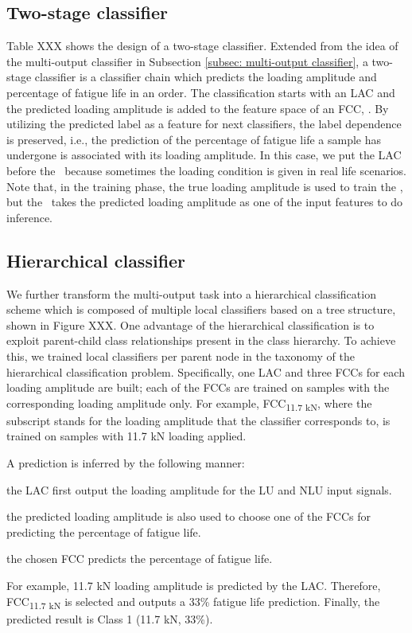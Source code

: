 \subsection{Two-stage classifier}
Table XXX shows the design of a two-stage classifier. Extended from the idea of the multi-output classifier in Subsection \ref{subsec: multi-output classifier}, a two-stage classifier is a classifier chain which predicts the loading amplitude and percentage of fatigue life in an order. The classification starts with an LAC and the predicted loading amplitude is added to the feature space of an FCC, \fcctwo. By utilizing the predicted label as a feature for next classifiers, the label dependence is preserved, i.e., the prediction of the percentage of fatigue life a sample has undergone is associated with its loading amplitude. In this case, we put the LAC before the \fcctwo \  because sometimes the loading condition is given in real life scenarios. Note that, in the training phase, the true loading amplitude is used to train the \fcctwo, but the \fcctwo \ takes the predicted loading amplitude as one of the input features to do inference.

\subsection{Hierarchical classifier}
We further transform the multi-output task into a hierarchical classification scheme which is composed of multiple local classifiers based on a tree structure, shown in Figure XXX. One advantage of the hierarchical classification is to exploit parent-child class relationships present in the class hierarchy. To achieve this, we trained local classifiers per parent node in the taxonomy of the hierarchical classification problem. Specifically, one LAC and three FCCs for each loading amplitude are built; each of the FCCs are trained on samples with the corresponding loading amplitude only. For example, FCC\textsubscript{11.7 kN}, where the subscript stands for the loading amplitude that the classifier corresponds to, is trained on samples with 11.7 kN loading applied. 

A prediction is inferred by the following manner: 
\begin{enumerate*}[label=\itshape\alph*\upshape)]
    \item the LAC first output the loading amplitude for the LU and NLU input signals.
    \item the predicted loading amplitude is also used to choose one of the FCCs for predicting the percentage of fatigue life.
    \item the chosen FCC predicts the percentage of fatigue life.
\end{enumerate*}
For example, 11.7 kN loading amplitude is predicted by the LAC. Therefore, FCC\textsubscript{11.7 kN} is selected and outputs a 33\% fatigue life prediction. Finally, the predicted result is Class 1 (11.7 kN, 33\%).

